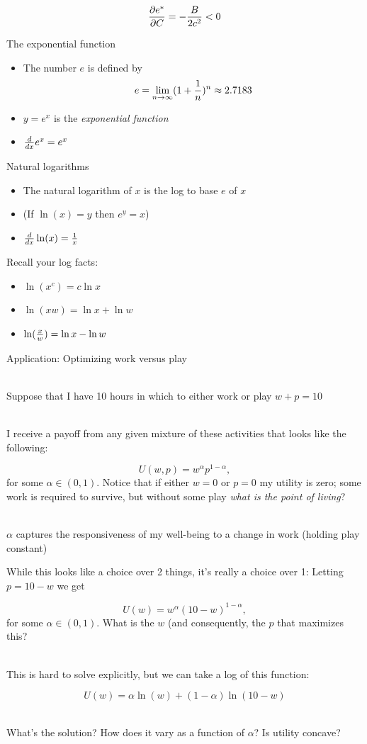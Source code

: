 \documentclass[10pt]{seminar}
\begin{document}
\begin{slide}
 $${\partial e^* \over {\partial C}}=-{{B}\over{2c^2}}<0$$

\newslide

The exponential function

\begin{itemize}
\item The number $e$ is defined by $$e=\lim_{n\rightarrow\infty}(1+{1\over n})^n \approx 2.7183$$
\item $y=e^x$ is the \textit{exponential function}
\item ${d\over{dx}}e^x=e^x$
\end{itemize}

\newslide
Natural logarithms

\begin{itemize}
\item The natural logarithm of $x$ is the log to base $e$ of $x$ 
\item (If $\ln(x)=y$ then $e^y=x$)
\item ${d\over{dx}}\ln(x)={1\over x}$
\end{itemize}
\vspace{.2in}
Recall your log facts:


\begin{itemize}
\item $\ln (x^c)=c\ln x$
\item $\ln (xw)=\ln x+\ln w$
\item $\ln ({x\over w})=\ln x-\ln w$
\end{itemize}

\newslide

Application: Optimizing work versus play

\ \\Suppose that I have 10 hours in which to either work or play $w+p=10$

\ \\I receive a payoff from any given mixture of these activities that looks like the following:

$$U(w, p)=w^\alpha p^{1-\alpha},$$ for some $\alpha\in (0, 1)$.  Notice that if either $w=0$ or $p=0$ my utility is zero; some work is required to survive, but without some play \textit{what is the point of living}?

\ \\$\alpha$ captures the responsiveness of my well-being to a change in work (holding play constant)

\newslide

While this looks like a choice over 2 things, it's really a choice over 1: Letting $p=10-w$ we get


$$U(w)=w^\alpha (10-w)^{1-\alpha},$$ for some $\alpha\in (0, 1)$. What is the $w$ (and consequently, the $p$ that maximizes this?

\ \\This is hard to solve explicitly, but we can take a log of this function:

$$U(w)=\alpha \ln(w)+(1-\alpha)\ln(10-w)$$

\ \\What's the solution? How does it vary as a function of $\alpha$? Is utility concave?



\end{slide}
\end{document}
